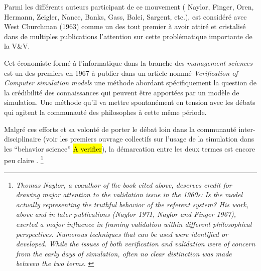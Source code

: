 
Parmi les différents auteurs participant de ce mouvement ( Naylor, Finger, Oren, Hermann, Zeigler, Nance, Banks, Gass, Balci, Sargent, etc.), \textcite{Naylor1966} est considéré avec West Churchman (1963) comme un des tout premier à avoir attiré et cristalisé  dans de multiples publications l'attention sur cette problématique importante de la V\&V.

Cet économiste formé à l'informatique dans la branche des \textit{management sciences} \autocite{Stricklin1985} est un des premiers en 1967 \autocite{Naylor1967} à publier dans un article nommé \textit{Verification of Computer simulation models} une méthode abordant spécifiquement la question de la crédibilité des connaissances qui peuvent être apportées par un modèle de simulation. Une méthode qu'il va mettre spontanément en tension avec les débats qui agitent la communauté des philosophes à cette même période.

Malgré ces efforts et sa volonté de porter le débat loin dans la communauté inter-disciplinaire (voir les premiers ouvrage collectifs sur l'usage de la simulation dans les \enquote{behavior science} \autocite{Dutton1971, Guetzkow1972} \hl{A verifier}), la démarcation entre les deux termes est encore peu claire \autocites[165]{Nance2002}[3]{Balci1986}. \footnote{\textit{Thomas Naylor, a coauthor of the book cited above, deserves credit for drawing major attention to the validation issue in the 1960s: Is the model actually representing the truthful behavior of the referent system? His work, above and in later publications (Naylor 1971, Naylor and Finger 1967), exerted a major influence in framing validation within different philosophical perspectives. Numerous techniques that can be used were identified or developed. While the issues of both verification and validation were of concern from the early days of simulation, often no clear distinction was made between the two terms.} \autocite[165]{Nance2002}}


